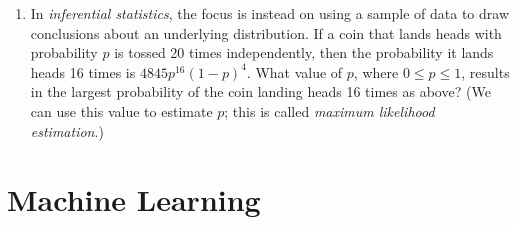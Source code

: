 \documentclass{article}
\begin{document}
\begin{enumerate}
\begin{enumerate}
        \vfill

    \end{enumerate}

    \newpage

    \item In \textit{inferential statistics}, the focus is instead on using a sample of data to draw conclusions about an underlying distribution. If a coin that lands heads with probability $p$ is tossed 20 times independently, then the probability it lands heads 16 times is $4845p^{16}(1-p)^4$. What value of $p$, where $0 \leq p \leq 1$, results in the largest probability of the coin landing heads 16 times as above? (We can use this value to estimate $p$; this is called \textit{maximum likelihood estimation}.) 

    \vfill 

\end{enumerate}

\section{Machine Learning}
\end{document}
